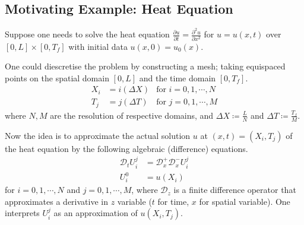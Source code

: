\documentclass[../dissertation.tex]{subfiles}
\begin{document}
\subsection{Motivating Example: Heat Equation}
Suppose one needs to solve the heat equation $\frac{\partial u}{\partial t} = \frac{\partial^2 u}{\partial x^2}$ for $u = u(x,t)$ over $\left[ 0, L \right] \times \left[ 0, T_f \right]$
with initial data $u\left( x,0 \right) = u_0 (x)$.

One could diescretise the problem by constructing a mesh;
taking equispaced points on the spatial domain $\left[ 0,L \right]$
and the time domain $\left[ 0,T_f \right]$.
\begin{align*}
    X_i &= i \left( \Delta X \right) & \text{for } i = 0, 1, \cdots, N \\
    T_j &= j \left( \Delta T \right) & \text{for } j = 0, 1, \cdots, M
\end{align*}
where $N, M$ are the resolution of respective domains,
and $\Delta X \coloneqq \frac{L}{N}$ and $\Delta T \coloneqq \frac{T_f}{M}$.

Now the idea is to approximate the actual solution $u$ at $\left( x,t \right) = \left( X_i, T_j \right)$ of the heat equation by the following algebraic (difference) equations.
\begin{align}
    \mathcal{D}_t U_{i}^j &= \mathcal{D}_x^+ \mathcal{D}_x^- U_{i}^j \\
    U_{i}^0 &= u\left( X_i \right)
\end{align}
for $i=0,1,\cdots,N$ and $j = 0, 1, \cdots, M$,
where $\mathcal{D}_z$ is a finite difference operator that approximates a derivative in $z$ variable ($t$ for time, $x$ for spatial variable).
One interprets $U_i^j$ as an approximation of $u \left( X_i, T_j \right)$.
\end{document}
